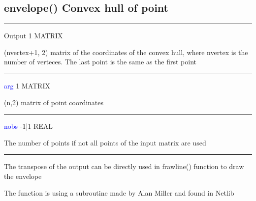 \subsection{\textcolor{VioletRed}{envelope}() Convex hull of point}
\label{envelope}
\vspace{0.3cm}
\hrule
\vspace{0.3cm}
\noindent Output \tabto{3cm}  1 \tabto{5cm}  MATRIX  \tabto{7cm}
\begin{changemargin}{3cm}{0cm}
\noindent  (nvertex+1, 2) matrix of the coordinates of the convex hull, where nvertex is the number of
verteces. The last point is the same as the first point
\end{changemargin}
\vspace{0.3cm}
\hrule
\vspace{0.3cm}
\noindent \textcolor{blue}{arg}  \tabto{3cm} 1 \tabto{5cm}  MATRIX  \tabto{7cm}
\begin{changemargin}{3cm}{0cm}
\noindent  (n,2) matrix of point coordinates
\end{changemargin}
\vspace{0.3cm}
\hrule
\vspace{0.3cm}
\noindent \textcolor{blue}{nobs} \tabto{3cm} -1|1 \tabto{5cm}   REAL \tabto{7cm}
\begin{changemargin}{3cm}{0cm}
\noindent  The number of points if not all
points of the input matrix are used
\end {changemargin}
\hrule
\vspace{0.2cm}
\begin{note}
The transpose of the output can be directly used in frawline() function
to draw the envelope
\end{note}
\begin{note}
The function is using a subroutine made by Alan Miller and found in Netlib
\end{note}
